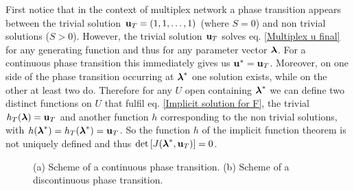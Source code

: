 \documentclass[
11pt, %
english, %
singlespacing, %
nolistspacing, %
liststotoc, %
headsepline, %
]{MastersDoctoralThesis} %
\begin{document}
First notice that in the context of multiplex network a phase transition appears between the trivial solution $\boldsymbol{\mathrm{u}}_T = (1, 1, \dots, 1)$ (where $S = 0$) and non trivial solutions ($S > 0$). However, the trivial solution $\boldsymbol{\mathrm{u}}_T$ solves eq. \eqref{Multiplex u final} for any generating function and thus for any parameter vector $\boldsymbol{\mathrm{\lambda}}$. For a continuous phase transition this immediately gives us $\boldsymbol{\mathrm{u}}^* = \boldsymbol{\mathrm{u}}_T$. Moreover, on one side of the phase transition occurring at $\boldsymbol{\mathrm{\lambda}}^*$ one solution exists, while on the other at least two do. Therefore for any $U$ open containing $\boldsymbol{\mathrm{\lambda}}^*$ we can define two distinct functions on $U$ that fulfil eq. \eqref{Implicit solution for F}, the trivial $h_T(\boldsymbol{\mathrm{\lambda}}) = \boldsymbol{\mathrm{u}}_T$ and another function $h$ corresponding to the non trivial solutions, with $h(\boldsymbol{\mathrm{\lambda}}^*) = h_T(\boldsymbol{\mathrm{\lambda}}^*) = \boldsymbol{\mathrm{u}}_T$. So the function $h$ of the implicit function theorem is not uniquely defined and thus $\det\left[ J(\boldsymbol{\mathrm{\lambda}}^*, \boldsymbol{\mathrm{u}}_T) \right] = 0$.

\begin{figure}
	\hfill
	\caption{(a) Scheme of a continuous phase transition. (b) Scheme of a discontinuous phase transition.}
	\label{Figure: Scheme of continuous and discontinuous phase transitions}
\end{figure}
\end{document}
